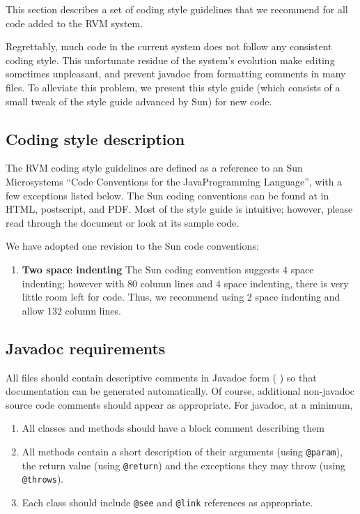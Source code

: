 This section describes a set of coding style guidelines that we
recommend for all code added to the RVM  system.  

Regrettably, much code in the current system does not follow any consistent
coding style.  This unfortunate residue of the system's evolution 
make editing sometimes unpleasant, and prevent javadoc from formatting comments
in
many files.  To alleviate this problem, we present this style guide 
(which consists of a small tweak of the style guide advanced by Sun) 
for new code. 


\subsection {Coding style description}

The RVM coding style guidelines are defined as a reference to an Sun
Microsystems ``Code Conventions for the Java\trademark Programming Language'',
with a few exceptions listed below.  The Sun coding
conventions can be found at 
\xlink{{\tt \SunCodeConventionURL}} {\SunCodeConventionURL} in HTML,
postscript, and PDF.  Most of the style guide is intuitive; 
however, please read through the document or look at its sample code.

We have adopted one revision to the Sun code conventions:
\begin{enumerate}
\item {\bf Two space indenting} The Sun coding convention suggests 4
space indenting; however with 80 column lines and 4 space indenting,
there is very little room left for code.  Thus, we recommend using 2
space indenting and allow 132 column lines.

\end{enumerate}

\JavaTMFooter

\subsection {Javadoc requirements}

All files should contain descriptive comments
in Javadoc form (
\xlink{{\tt \JavadocURL}} {\JavadocURL}
) so
that documentation can be generated automatically.  Of course,
additional non-javadoc source code comments should appear as
appropriate.
For javadoc, at a minimum,

\begin{enumerate}
\item All classes and methods should have a block comment describing
them
\item All methods contain a short description of their arguments
(using {\tt @param}), the return value (using {\tt @return}) and the
exceptions they may throw (using {\tt @throws}).
\item Each class should include {\tt @see} and {\tt @link} 
references as appropriate.
\end{enumerate}

